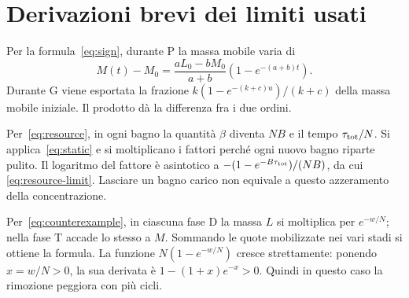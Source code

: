 \documentclass[11pt,reqno]{amsart}
\numberwithin{equation}{section}
\begin{document}
\section{Derivazioni brevi dei limiti usati}

Per la formula~\eqref{eq:sign}, durante P la massa mobile
varia di
\[
 M(t)-M_0=\frac{aL_0-bM_0}{a+b}
                 (1-e^{-(a+b)t}).
\]
Durante G viene esportata la frazione
$k(1-e^{-(k+c)u})/(k+c)$ della massa mobile iniziale.
Il prodotto d\`a la differenza fra i due ordini.

Per~\eqref{eq:resource}, in ogni bagno la quantit\`a
$\beta$ diventa $NB$ e il tempo $\tau_{\rm tot}/N$.
Si applica~\eqref{eq:static} e si moltiplicano i fattori
perch\'e ogni nuovo bagno riparte pulito. Il logaritmo del
fattore \`e asintotico a
$-(1-e^{-B\tau_{\rm tot}})/(NB)$, da cui
\eqref{eq:resource-limit}. Lasciare un bagno carico non
equivale a questo azzeramento della concentrazione.

Per~\eqref{eq:counterexample}, in ciascuna fase D la massa
$L$ si moltiplica per $e^{-w/N}$; nella fase T accade
lo stesso a $M$. Sommando le quote mobilizzate nei vari
stadi si ottiene la formula. La funzione
$N(1-e^{-w/N})$ cresce strettamente: ponendo $x=w/N>0$,
la sua derivata \`e $1-(1+x)e^{-x}>0$.
Quindi in questo caso la rimozione peggiora con pi\`u cicli.
\end{document}
